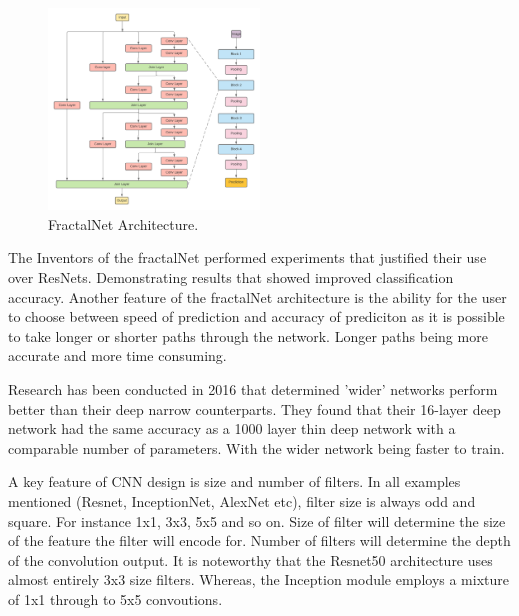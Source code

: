     \begin{figure}
      \centering
      \includegraphics[width=0.5\textwidth]{Images/FractalNetArchitectureCopy}
      \caption{\label{fig:FractalNet_arcitecture}FractalNet Architecture.}
    \end{figure}
  \par
  The Inventors of the fractalNet performed experiments that justified their use over ResNets. Demonstrating results that showed improved classification accuracy. Another feature of the fractalNet architecture is the ability for the user to choose between speed of prediction and accuracy of prediciton as it is possible to take longer or shorter paths through the network. Longer paths being more accurate and more time consuming.
  \par
  Research has been conducted in 2016 \cite{Zagoruyko} that determined 'wider' networks perform better than their deep narrow counterparts. They found that their 16-layer deep network had the same accuracy as a 1000 layer thin deep network with a comparable number of parameters. With the wider network being faster to train.
  \par
  A key feature of CNN design is size and number of filters. In all examples mentioned (Resnet, InceptionNet, AlexNet etc), filter size is always odd and square. For instance 1x1, 3x3, 5x5 and so on. Size of filter will determine the size of the feature the filter will encode for. Number of filters will determine the depth of the convolution output. It is noteworthy that the Resnet50 architecture \cite{He} uses almost entirely 3x3 size filters. Whereas, the Inception module employs a mixture of 1x1 through to 5x5 convoutions.
  \par
